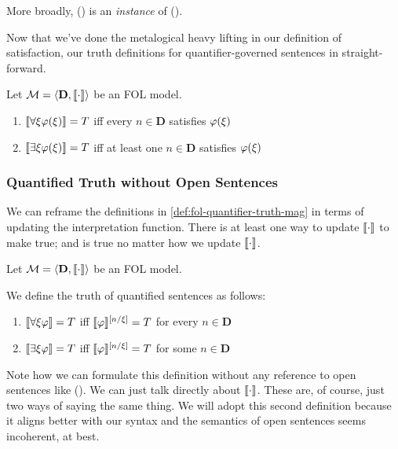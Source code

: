 More broadly, \ephi(\etau) is an \emph{instance} of \eexists\exi\ephi(\exi).

Now that we've done the metalogical heavy lifting in our definition of
satisfaction, our truth definitions for quantifier-governed sentences in
straight-forward.

\begin{definition}
  \label{def:fol-quantifier-truth-mag}
  Let $\mathcal{M}=\langle\mathbf{D},\llbracket\cdot\rrbracket\rangle$ be an FOL model.
  \begin{enumerate}
  \item $\llbracket\forall\xi\varphi(\xi)\rrbracket=T$ iff
    every $n\in\mathbf{D}$ satisfies $\varphi(\xi)$
  \item $\llbracket\exists \xi\varphi(\xi)\rrbracket=T$ iff at least one
    $n\in\mathbf{D}$ satisfies $\varphi(\xi)$
  \end{enumerate}
\end{definition}

\subsubsection{Quantified Truth without Open Sentences}

We can reframe the definitions in \ref{def:fol-quantifier-truth-mag} in terms
of updating the interpretation function. There is at least one way to update
$\llbracket\cdot\rrbracket$ to make \eexists\exi\ephi true; and \eforall\exi\ephi is true
no matter how we update $\llbracket\cdot\rrbracket$.

\begin{definition}
  \label{def:fol-quantifier-truth}
  Let $\mathcal{M}=\langle\mathbf{D},\llbracket\cdot\rrbracket\rangle$ be an FOL model.
  
  We define the truth of quantified sentences as follows:
  
  \begin{enumerate}
  \item $\llbracket\forall\xi\varphi\rrbracket=T$ iff
    $\llbracket\varphi\rrbracket^{[n/\xi]}=T$ for every $n\in\mathbf{D}$
  \item $\llbracket\exists \xi\varphi\rrbracket=T$ iff
    $\llbracket\varphi\rrbracket^{[n/\xi]}=T$ for some $n\in\mathbf{D}$
  \end{enumerate}
  
\end{definition}

Note how we can formulate this definition without any reference to open
sentences like \ephi(\exi). We can just talk directly about $\llbracket\cdot\rrbracket$.
These are, of course, just two ways of saying the same thing. We will adopt this
second definition because it aligns better with our syntax and the semantics
of open sentences seems incoherent, at best.

